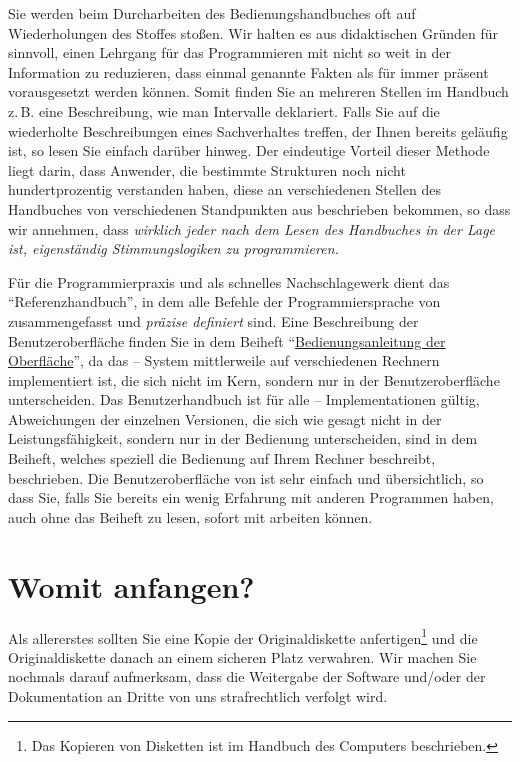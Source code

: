 Sie werden beim Durcharbeiten des Bedienungshandbuches oft auf
Wiederholungen des Stoffes stoßen. Wir
halten es aus didaktischen Gründen für sinnvoll, einen Lehrgang für
das Programmieren mit \mutabor{} nicht so weit in der Information zu
reduzieren, dass einmal genannte Fakten als für immer präsent
vorausgesetzt werden können.  Somit finden Sie an mehreren Stellen im
Handbuch z.\,B. eine Beschreibung, wie man Intervalle deklariert. Falls
Sie auf die wiederholte Beschreibungen eines Sachverhaltes treffen,
der Ihnen bereits geläufig ist, so lesen Sie einfach darüber hinweg.
Der eindeutige Vorteil dieser Methode liegt darin, dass Anwender, die
bestimmte Strukturen noch nicht hundertprozentig verstanden haben,
diese an verschiedenen Stellen des Handbuches von verschiedenen
Standpunkten aus beschrieben bekommen, so dass wir annehmen, dass {\em
  wirklich jeder nach dem Lesen des Handbuches in der Lage ist,
  eigenständig Stimmungslogiken zu programmieren.}

Für die Programmierpraxis und als schnelles Nachschlagewerk dient das
"`Referenzhandbuch"', in dem alle Befehle der
Programmiersprache von \mutabor{}
zusammengefasst und \emph{präzise definiert} sind.  Eine Beschreibung
der Benutzeroberfläche finden Sie in dem Beiheft
"`\href{\makefilename{bedienung}}{Bedienungsanleitung der
  Oberfläche}"', da das \mutabor{} --
System mittlerweile auf verschiedenen Rechnern implementiert ist, die
sich nicht im Kern, sondern nur in der Benutzeroberfläche
unterscheiden. Das Benutzerhandbuch ist für alle \mutabor{} --
Implementationen gültig, Abweichungen der einzelnen Versionen, die
sich wie gesagt nicht in der Leistungsfähigkeit, sondern nur in der
Bedienung unterscheiden, sind in dem Beiheft, welches speziell die
Bedienung auf Ihrem Rechner beschreibt, beschrieben. Die
Benutzeroberfläche von \mutabor{} ist sehr einfach und übersichtlich,
so dass Sie, falls Sie bereits ein wenig Erfahrung mit anderen
Programmen haben, auch ohne das Beiheft zu lesen, sofort mit
\mutabor{} arbeiten können.

\section{Womit anfangen?}\label{sec:womit-anfangen-}

\iffalse
{} Als allererstes sollten Sie eine Kopie der
Originaldiskette an\-fer\-ti\-gen\footnote{Das Kopieren von Disketten
  ist im Handbuch des Computers beschrieben.} und die Originaldiskette
danach an einem sicheren Platz verwahren. Wir machen Sie nochmals
darauf aufmerksam, dass die Weitergabe der Software und/oder der
Dokumentation an Dritte von uns strafrechtlich verfolgt wird.

